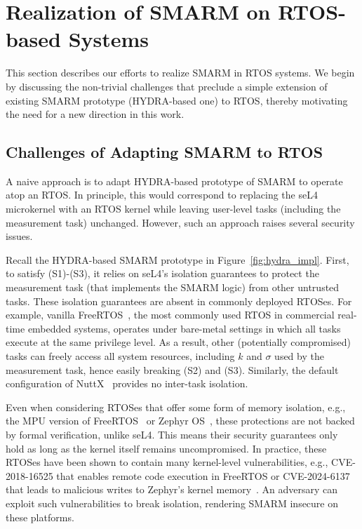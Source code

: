 \documentclass{ieeeaccess}
\begin{document}
\section{Realization of SMARM on RTOS-based Systems}
\label{sec:porting}

This section describes our efforts to realize SMARM in RTOS systems.
We begin by discussing the non-trivial challenges that preclude a simple extension of existing SMARM prototype (HYDRA-based one) to RTOS, thereby motivating the need for a new direction in this work.




\subsection{Challenges of Adapting SMARM to RTOS}\label{subsec:naive}

A naive approach is to adapt HYDRA-based prototype of SMARM to operate atop an RTOS.
In principle, this would correspond to replacing the seL4 microkernel with an RTOS kernel while leaving user-level tasks (including the measurement task) unchanged.
However, such an approach raises several security issues.


Recall the HYDRA-based SMARM prototype in Figure~\ref{fig:hydra_impl}.
First, to satisfy (S1)-(S3), it relies on seL4's isolation guarantees to protect the measurement task (that implements the SMARM logic) from other untrusted tasks.
These isolation guarantees are absent in commonly deployed RTOSes.
For example, vanilla FreeRTOS~\cite{freertos}, the most commonly used RTOS in commercial real-time embedded systems, operates under bare-metal settings in which all tasks execute at the same privilege level.
As a result, other (potentially compromised) tasks can freely access all system resources, including $k$ and $\sigma$ used by the measurement task, hence easily breaking (S2) and (S3).
Similarly, the default configuration of NuttX~\cite{nuttx} provides no inter-task isolation.

Even when considering RTOSes that offer some form of memory isolation, e.g., the MPU version of FreeRTOS~\cite{freertos-mpu} or Zephyr OS~\cite{zephyr}, these protections are not backed by formal verification, unlike seL4.
This means their security guarantees only hold as long as the kernel itself remains uncompromised.
In practice, these RTOSes have been shown to contain many kernel-level vulnerabilities, e.g., CVE-2018-16525 that enables remote code execution in FreeRTOS or CVE-2024-6137 that leads to malicious writes to Zephyr's kernel memory~\cite{cve_freertos_rce,cve_zephyr_memory}.
An adversary can exploit such vulnerabilities to break isolation, rendering SMARM insecure on these platforms.
\end{document}
